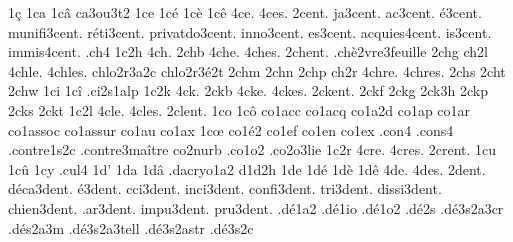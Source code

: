 {%
1ç
1ca
1câ
ca3ou3t2 %
1ce
1cé
1cè
1cê
4ce.
4ces.
        2cent.
      ja3cent.
      ac3cent.
       é3cent.
  munifi3cent.
    réti3cent.
privatdo3cent.
    inno3cent.
      es3cent.
 acquies4cent.
      is3cent.
   immis4cent.
%
.ch4
1c2h
4ch.
2chb
4che.
4ches.
2chent. %
                    .chè2vre3feuille %
2chg
ch2l
4chle.
4chles.
                    chlo2r3a2c
                    chlo2r3é2t
2chm
2chn
2chp
ch2r
4chre.
4chres.
2chs
2cht
2chw
1ci
1cî
                    .ci2s1alp
1c2k
4ck.
2ckb
4cke.
4ckes.
2ckent. %
2ckf
2ckg
2ck3h
2ckp
2cks
2ckt
1c2l
4cle.
4cles.
2clent. %
1co
1cô
                    co1acc
                    co1acq
                    co1a2d
                    co1ap
                    co1ar
                    co1assoc
                    co1assur
                    co1au
                    co1ax
1cœ
                    co1é2
                    co1ef
                    co1en
                    co1ex
                    .con4  %
                    .cons4 %
                    .contre1s2c
                    .contre3maître %
                    co2nurb
                    .co1o2
                    .co2o3lie
1c2r
4cre.
4cres.
2crent. %
1cu
1cû
1cy
.cul4 %
1d'
1da
1dâ
                    .dacryo1a2
d1d2h
1de
1dé
1dè
1dê
4de.
4des.
     2dent.
 déca3dent.
    é3dent.
  cci3dent.
 inci3dent.
confi3dent.
  tri3dent.
dissi3dent.
chien3dent.
  .ar3dent.
 impu3dent.
  pru3dent.
%
                    .dé1a2
                    .dé1io
                    .dé1o2
                    .dé2s %
                    .dé3s2a3cr
                    .dés2a3m %
                    .dé3s2a3tell
                    .dé3s2astr
                    .dé3s2c %
}
